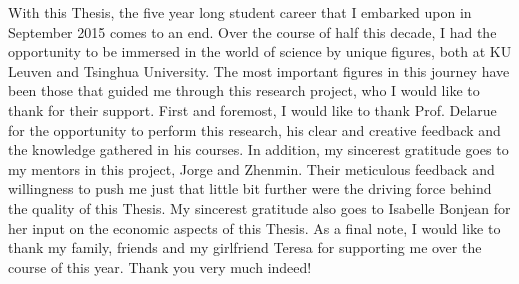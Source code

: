 \documentclass[master=ene,english]{kulemt}
\begin{document}
\begin{preface}
With this Thesis, the five year long student career that I embarked upon in September 2015 comes to an end. Over the course of half this decade, I had the opportunity to be immersed in the world of science by unique figures, both at KU Leuven and Tsinghua University. The most important figures in this journey have been those that guided me through this research project, who I would like to thank for their support.
\newline \newline
First and foremost, I would like to thank Prof. Delarue for the opportunity to perform this research, his clear and creative feedback and the knowledge gathered in his courses. In addition, my sincerest gratitude goes to my mentors in this project, Jorge and Zhenmin. Their meticulous feedback and willingness to push me just that little bit further were the driving force behind the quality of this Thesis. My sincerest gratitude also goes to Isabelle Bonjean for her input on the economic aspects of this Thesis. As a final note, I would like to thank my family, friends and my girlfriend Teresa for supporting me over the course of this year. Thank you very much indeed! 
\end{preface}

\tableofcontents*
\end{document}
